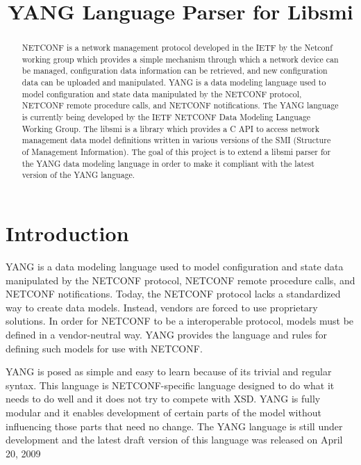 \documentclass[conference]{IEEEtran}
\begin{document}
\title{YANG Language Parser for Libsmi}
\author{
}

\maketitle

\begin{abstract}
NETCONF is a network management protocol developed in the IETF by the Netconf working group  which provides a simple mechanism through which a network device can be managed, configuration data information can be retrieved, and new configuration data can be uploaded and manipulated. YANG is a data modeling language used to model configuration and state data manipulated by the NETCONF protocol, NETCONF remote procedure calls, and NETCONF notifications. The YANG language is currently being developed by the IETF NETCONF Data Modeling Language Working Group. The libsmi is a library which provides a C API to access network management data model definitions written in various versions of the SMI (Structure of Management Information). The goal of this project is to extend a libsmi parser for the YANG data modeling language in order to make it compliant with the latest version of the YANG language.
\end{abstract}

\section{Introduction}
YANG is a data modeling language used to model configuration and state data manipulated by the NETCONF protocol, NETCONF remote procedure calls, and NETCONF notifications. Today, the NETCONF protocol \cite{bib1} lacks a standardized way to create data models. Instead, vendors are forced to use proprietary solutions. In order for NETCONF to be a interoperable protocol, models must be defined in a vendor-neutral way. YANG provides the language and rules for defining such models for use with NETCONF. 

YANG is posed as simple and easy to learn because of its trivial and regular syntax. This language is NETCONF-specific language designed to do what it needs to do well and it does not try to compete with XSD. YANG is fully modular and it enables development of certain parts of the model without influencing those parts that need no change. The YANG language is still under development and the latest draft version of this language was released on April 20, 2009 
\end{document}
